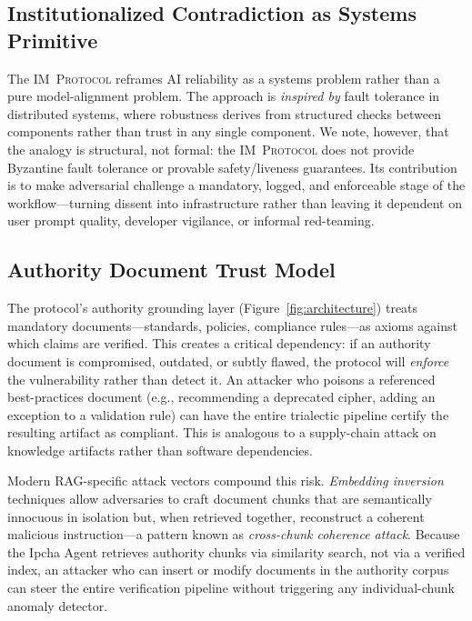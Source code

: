 \documentclass[11pt,a4paper]{article}
\newcommand{\protshort}{\textsc{IM~Protocol}}
\begin{document}
\subsection{Institutionalized Contradiction as Systems Primitive}
The \protshort{} reframes AI reliability as a systems problem rather than a pure model-alignment problem.
The approach is \emph{inspired by} fault tolerance in distributed systems, where robustness derives from structured checks between components rather than trust in any single component.
We note, however, that the analogy is structural, not formal: the \protshort{} does not provide Byzantine fault tolerance or provable safety/liveness guarantees.
Its contribution is to make adversarial challenge a mandatory, logged, and enforceable stage of the workflow---turning dissent into infrastructure rather than leaving it dependent on user prompt quality, developer vigilance, or informal red-teaming.

\subsection{Authority Document Trust Model}
\label{sec:authority-trust}
The protocol's authority grounding layer (Figure~\ref{fig:architecture}) treats mandatory documents---standards, policies, compliance rules---as axioms against which claims are verified.
This creates a critical dependency: if an authority document is compromised, outdated, or subtly flawed, the protocol will \emph{enforce} the vulnerability rather than detect it.
An attacker who poisons a referenced best-practices document (e.g., recommending a deprecated cipher, adding an exception to a validation rule) can have the entire trialectic pipeline certify the resulting artifact as compliant.
This is analogous to a supply-chain attack on knowledge artifacts rather than software dependencies.

Modern RAG-specific attack vectors compound this risk.
\emph{Embedding inversion} techniques allow adversaries to craft document chunks that are semantically innocuous in isolation but, when retrieved together, reconstruct a coherent malicious instruction---a pattern known as \emph{cross-chunk coherence attack}.
Because the Ipcha Agent retrieves authority chunks via similarity search, not via a verified index, an attacker who can insert or modify documents in the authority corpus can steer the entire verification pipeline without triggering any individual-chunk anomaly detector.
\end{document}
